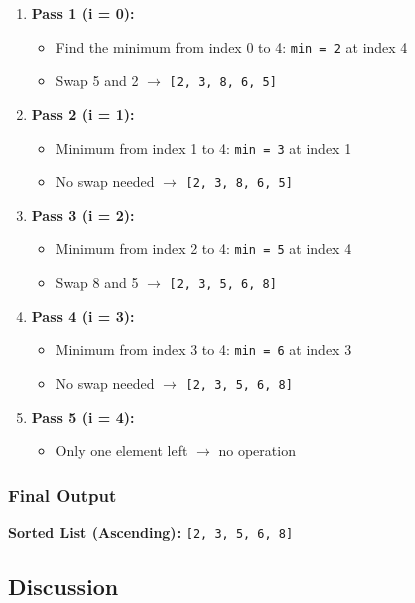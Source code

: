 \documentclass{article}
\begin{document}
\begin{enumerate}
    \item \textbf{Pass 1 (i = 0):}
    \begin{itemize}
        \item Find the minimum from index 0 to 4: \texttt{min = 2} at index 4
        \item Swap 5 and 2 $\rightarrow$ \texttt{[2, 3, 8, 6, 5]}
    \end{itemize}
    
    \item \textbf{Pass 2 (i = 1):}
    \begin{itemize}
        \item Minimum from index 1 to 4: \texttt{min = 3} at index 1
        \item No swap needed $\rightarrow$ \texttt{[2, 3, 8, 6, 5]}
    \end{itemize}

    \item \textbf{Pass 3 (i = 2):}
    \begin{itemize}
        \item Minimum from index 2 to 4: \texttt{min = 5} at index 4
        \item Swap 8 and 5 $\rightarrow$ \texttt{[2, 3, 5, 6, 8]}
    \end{itemize}

    \item \textbf{Pass 4 (i = 3):}
    \begin{itemize}
        \item Minimum from index 3 to 4: \texttt{min = 6} at index 3
        \item No swap needed $\rightarrow$ \texttt{[2, 3, 5, 6, 8]}
    \end{itemize}

    \item \textbf{Pass 5 (i = 4):}
    \begin{itemize}
        \item Only one element left $\rightarrow$ no operation
    \end{itemize}
\end{enumerate}
\subsubsection*{Final Output}
\textbf{Sorted List (Ascending):} \texttt{[2, 3, 5, 6, 8]}


\subsection*{Discussion}
\end{document}
